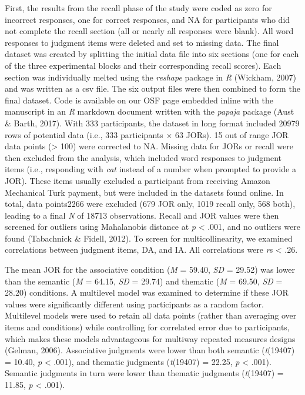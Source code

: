 \documentclass[english,,man]{apa6}
\begin{document}
First, the results from the recall phase of the study were coded as zero for incorrect responses, one for correct responses, and NA for participants who did not complete the recall section (all or nearly all responses were blank). All word responses to judgment items were deleted and set to missing data. The final dataset was created by splitting the initial data file into six sections (one for each of the three experimental blocks and their corresponding recall scores). Each section was individually melted using the \emph{reshape} package in \emph{R} (Wickham, 2007) and was written as a csv file. The six output files were then combined to form the final dataset. Code is available on our OSF page embedded inline with the manuscript in an \emph{R} markdown document written with the \emph{papaja} package (Aust \& Barth, 2017). With 333 participants, the dataset in long format included 20979 rows of potential data (i.e., 333 participants \(\times\) 63 JORs). 15 out of range JOR data points (\textgreater{} 100) were corrected to NA. Missing data for JORs or recall were then excluded from the analysis, which included word responses to judgment items (i.e., responding with \emph{cat} instead of a number when prompted to provide a JOR). These items usually excluded a participant from receiving Amazon Mechanical Turk payment, but were included in the datasets found online. In total, data points2266 were excluded (679 JOR only, 1019 recall only, 568 both), leading to a final \emph{N} of 18713 observations. Recall and JOR values were then screened for outliers using Mahalanobis distance at \emph{p} \textless{} .001, and no outliers were found (Tabachnick \& Fidell, 2012). To screen for multicollinearity, we examined correlations between judgment items, DA, and IA. All correlations were \emph{r}s \textless{} .26.

The mean JOR for the associative condition (\emph{M} = 59.40, \emph{SD} = 29.52) was lower than the semantic (\emph{M} = 64.15, \emph{SD} = 29.74) and thematic (\emph{M} = 69.50, \emph{SD} = 28.20) conditions. A multilevel model was examined to determine if these JOR values were significantly different using participants as a random factor. Multilevel models were used to retain all data points (rather than averaging over items and conditions) while controlling for correlated error due to participants, which makes these models advantageous for multiway repeated measures designs (Gelman, 2006). Associative judgments were lower than both semantic (\emph{t}(19407) = 10.40, \emph{p} \textless{} .001), and thematic judgments (\emph{t}(19407) = 22.25, \emph{p} \textless{} .001). Semantic judgments in turn were lower than thematic judgments (\emph{t}(19407) = 11.85, \emph{p} \textless{} .001).
\end{document}
